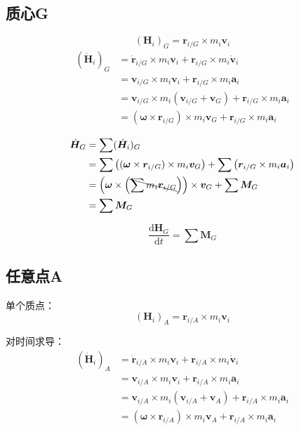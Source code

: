 \subsection{质心G}
\begin{equation}
  (\bm{H}_i)_G=\bm{r}_{i/G}\times m_i\bm{v}_i
\end{equation}
\begin{equation}
  \begin{split}
    (\dot{\bm{H}}_i)_G&=\dot{\bm{r}}_{i/G}\times m_i\bm{v}_i+\bm{r}_{i/G}\times m_i\dot{\bm{v}}_i\\
    &=\bm{v}_{i/G}\times m_i\bm{v}_i+\bm{r}_{i/G}\times m_i\bm{a}_i\\
    &=\bm{v}_{i/G}\times m_i(\bm{v}_{i/G}+\bm{v}_G)+\bm{r}_{i/G}\times m_i\bm{a}_i\\
    &=(\bm{\omega}\times\bm{r}_{i/G})\times m_i\bm{v}_G+\bm{r}_{i/G}\times m_i\bm{a}_i
  \end{split}
\end{equation}

\begin{equation}
  \begin{split}
    \dot{\bm{H}}_G&=\sum(\dot{\bm{H}}_i)_G\\
    &=\sum\qty((\bm{\omega}\times\bm{r}_{i/G})\times m_i\bm{v}_G)+\sum\qty(\bm{r}_{i/G}\times m_i\bm{a}_i)\\
    &=\qty(\bm{\omega}\times\qty(\bcancel{\sum m_i\bm{r}_{i/G}}))\times\bm{v}_G+\sum\bm{M}_G\\
    &=\sum\bm{M}_G
  \end{split}
\end{equation}

\begin{theorem}[质心G角动量守恒定律]
  \begin{equation}
    \frac{\mathrm{d}\bm{H}_G}{\mathrm{d}t}=\sum \bm{M}_G
  \end{equation}
\end{theorem}

\subsection{任意点A}
单个质点：
\begin{equation}
  (\bm{H}_i)_A=\bm{r}_{i/A}\times m_i\bm{v}_i
\end{equation}

对时间求导：
\begin{equation}
  \begin{split}
    (\dot{\bm{H}}_i)_A&=\dot{\bm{r}}_{i/A}\times m_i\bm{v}_i+\bm{r}_{i/A}\times m_i\dot{\bm{v}}_i\\
    &=\bm{v}_{i/A}\times m_i\bm{v}_i+\bm{r}_{i/A}\times m_i\bm{a}_i\\
    &=\bm{v}_{i/A}\times m_i(\bm{v}_{i/A}+\bm{v}_A)+\bm{r}_{i/A}\times m_i\bm{a}_i\\
    &=(\bm{\omega}\times\bm{r}_{i/A})\times m_i\bm{v}_A+\bm{r}_{i/A}\times m_i\bm{a}_i
  \end{split}
\end{equation}

